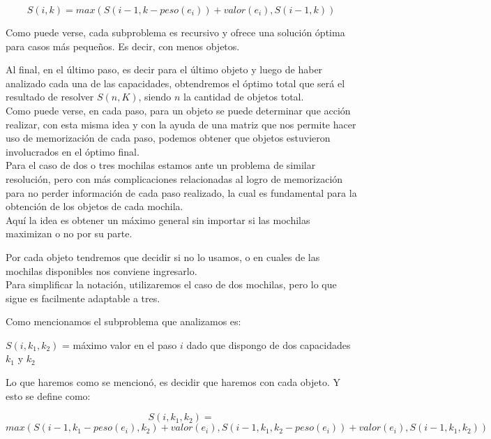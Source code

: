 \begin{equation}
S(i, k) = max(S(i-1, k-peso(e_i))+valor(e_i), S(i-1, k))
\end{equation}

Como puede verse, cada subproblema es recursivo y ofrece una solución \'optima para casos m\'as pequeños. Es decir, con menos objetos.

Al final, en el último paso, es decir para el último objeto y luego de haber analizado cada una de las capacidades, obtendremos el \'optimo total que será el resultado de resolver $S(n, K)$, siendo $n$ la cantidad de objetos total.\\

Como puede verse, en cada paso, para un objeto se puede determinar que acción realizar, con esta misma idea y con la ayuda de una matriz que nos permite hacer uso de memorizaci\'on de cada paso, podemos obtener que objetos estuvieron involucrados en el \'optimo final.\\

Para el caso de dos o tres mochilas estamos ante un problema de similar resolución, pero con más complicaciones relacionadas al logro de memorización para no perder información de cada paso realizado, la cual es fundamental para la obtención de los objetos de cada mochila.\\

Aquí la idea es obtener un máximo general sin importar si las mochilas maximizan o no por su parte.

Por cada objeto tendremos que decidir si no lo usamos, o en cuales de las mochilas disponibles nos conviene ingresarlo.\\
Para simplificar la notación, utilizaremos el caso de dos mochilas, pero lo que sigue es facilmente adaptable a tres.

Como mencionamos el subproblema que analizamos es:

\begin{center}
$S(i, k_1, k_2)$ = máximo valor en el paso $i$ dado que dispongo de dos capacidades $k_1$ y $k_2$
\end{center}

Lo que haremos como se mencionó, es decidir que haremos con cada objeto. Y esto se define como:

\begin{equation}
S(i, k_1, k_2) = 
\end{equation}
\begin{equation}
max(S(i-1, k_1-peso(e_i), k_2)+valor(e_i), 
        S(i-1, k_1, k_2-peso(e_i))+valor(e_i), 
        S(i-1, k_1, k_2))
\end{equation}


